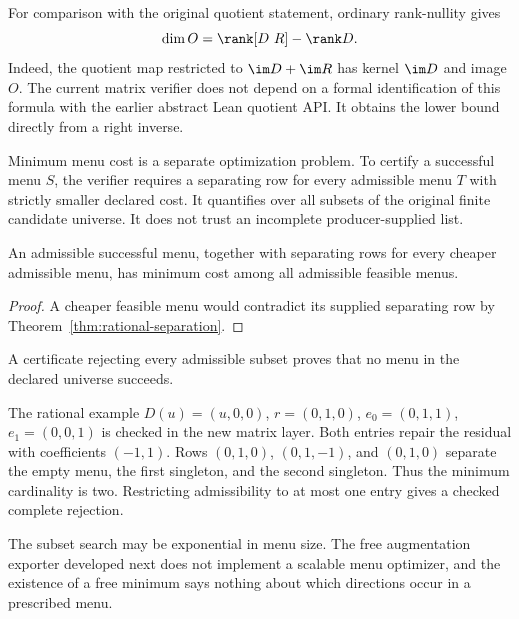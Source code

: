 For comparison with the original quotient statement, ordinary rank-nullity gives
\begin{equation}\label{eq:rank-difference-new}
 \dim O=\rank[D\ R]-\rank D.
\end{equation}
Indeed, the quotient map restricted to $\im D+\im R$ has kernel $\im D$ and image $O$. The current matrix verifier does not depend on a formal identification of this formula with the earlier abstract Lean quotient API. It obtains the lower bound directly from a right inverse.

Minimum menu cost is a separate optimization problem. To certify a successful menu $S$, the verifier requires a separating row for every admissible menu $T$ with strictly smaller declared cost. It quantifies over all subsets of the original finite candidate universe. It does not trust an incomplete producer-supplied list.

\begin{theorem}
An admissible successful menu, together with separating rows for every cheaper admissible menu, has minimum cost among all admissible feasible menus.
\end{theorem}
\begin{proof}
A cheaper feasible menu would contradict its supplied separating row by Theorem~\ref{thm:rational-separation}.
\end{proof}

A certificate rejecting every admissible subset proves that no menu in the declared universe succeeds.

The rational example $D(u)=(u,0,0)$, $r=(0,1,0)$, $e_0=(0,1,1)$, $e_1=(0,0,1)$ is checked in the new matrix layer. Both entries repair the residual with coefficients $(-1,1)$. Rows $(0,1,0)$, $(0,1,-1)$, and $(0,1,0)$ separate the empty menu, the first singleton, and the second singleton. Thus the minimum cardinality is two. Restricting admissibility to at most one entry gives a checked complete rejection.

The subset search may be exponential in menu size. The free augmentation exporter developed next does not implement a scalable menu optimizer, and the existence of a free minimum says nothing about which directions occur in a prescribed menu.

